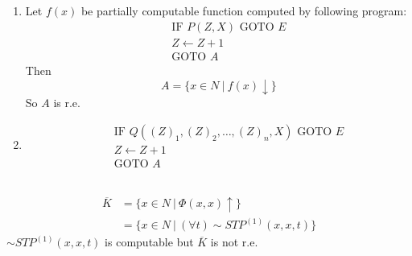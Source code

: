 \subsection{}
\begin{enumerate}
  \item 
  Let $f(x)$ be partially computable function computed by following program:
  \begin{align*}
    [A]\quad & \text{IF } P(Z,X) \text{ GOTO } E \\
             & Z \gets Z + 1 \\
             & \text{GOTO } A 
  \end{align*}
  Then
  \[ A = \{ x\in N\ |\ f(x)\downarrow \} \]
  So $A$ is r.e.
  
  \item 
  \begin{align*}
    [A]\quad & \text{IF } Q((Z)_1,(Z)_2,\dots,(Z)_n,X) \text{ GOTO } E \\
             & Z \gets Z + 1 \\
             & \text{GOTO } A
  \end{align*}
\end{enumerate}


\subsection{}
\begin{align*}
  \overline{K} & = \{ x\in N\ |\ \Phi(x,x)\uparrow \} \\
               & = \{ x\in N\ |\ (\forall t)\sim STP^{(1)}(x,x,t) \}
\end{align*}
$\sim STP^{(1)}(x,x,t)$ is computable but $\overline{K}$ is not r.e.
